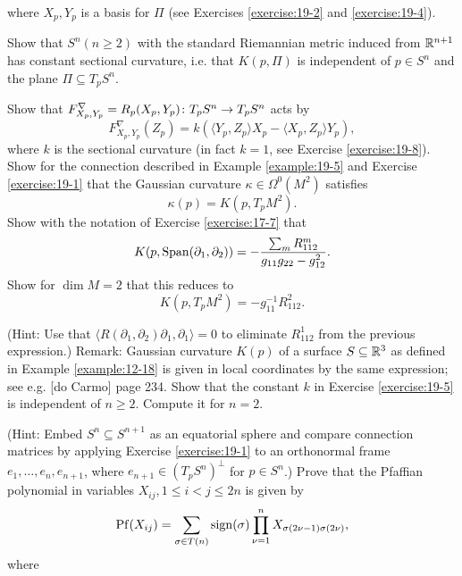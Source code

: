 \begin{enumerate}[label=\theexercise.\arabic*.,ref=\theexercise.\arabic*,leftmargin=2.7em]
\[    \]
    where ${X}_{p},{Y}_{p}$ is a basis for $\Pi$ (see Exercises \ref{exercise:19-2} and \ref{exercise:19-4}).\par
    Show that ${S}^{n}( {n \geq  2})$ with the standard Riemannian metric induced from ${\mathbb{R}}^{n + 1}$ has constant sectional curvature, i.e. that $K( {p,\Pi })$ is independent of $p \in  {S}^{n}$ and the plane $\Pi  \subseteq  {T}_{p}{S}^{n}$.\par
    Show that ${F}_{{X}_{p},{Y}_{p}}^{\nabla } = {R}_{p}( {{X}_{p},{Y}_{p}})\colon {T}_{p}{S}^{n} \rightarrow  {T}_{p}{S}^{n}$ acts by
    \[
      {F}_{{X}_{p},{Y}_{p}}^{\nabla }( {Z}_{p})  = k( {\langle  {{Y}_{p},{Z}_{p}}\rangle  {X}_{p}- \langle  {{X}_{p},{Z}_{p}}\rangle  {Y}_{p}}),
    \]
    where $k$ is the sectional curvature (in fact $k = 1$, see Exercise \ref{exercise:19-8}).
  \NewItem Show for the connection described in Example \ref{example:19-5} and Exercise \ref{exercise:19-1} that the Gaussian curvature $\kappa  \in  {\Omega }^{0}( {M}^{2})$ satisfies
    \[
      \kappa ( p)  = K( {p,{T}_{p}{M}^{2}}).
    \]
  \NewItem Show with the notation of Exercise \ref{exercise:17-7} that
    \[
      K( {p,\mathrm{Span}( {{\partial }_{1},{\partial }_{2}}) })  = - \frac{\sum_{m}{R}_{112}^{m}}{{g}_{11}{g}_{22}- {g}_{12}^{2}}.
    \]
    Show for $\dim M = 2$ that this reduces to
    \[
      K( {p,{T}_{p}{M}^{2}})  = - {g}_{11}^{-1}{R}_{112}^{2}.
    \]
    \par(Hint: Use that $\langle  {R( {{\partial }_{1},{\partial }_{2}}) {\partial }_{1},{\partial }_{1}}\rangle   = 0$ to eliminate ${R}_{112}^{1}$ from the previous expression.)
    Remark: Gaussian curvature $K( p)$ of a surface $S \subseteq  {\ensuremath{\mathbb{R}}}^{3}$ as defined in Example \ref{example:12-18} is given in local coordinates by the same expression; see e.g. [do Carmo]\supercite{do-Carmo} page 234.
  \NewItem Show that the constant $k$ in Exercise \ref{exercise:19-5} is independent of $n \geq  2$. Compute it for $n = 2$.
    \par(Hint: Embed ${S}^{n} \subseteq  {S}^{n + 1}$ as an equatorial sphere and compare connection matrices by applying Exercise \ref{exercise:19-1} to an orthonormal frame ${e}_{1},\ldots,{e}_{n},{e}_{n + 1}$, where ${e}_{n + 1} \in  {( {T}_{p}{S}^{n}) }^{ \bot  }$ for $p \in  {S}^{n}$.)
  \NewItem Prove that the Pfaffian polynomial in variables ${X}_{ij},1 \leq  i < j \leq  {2n}$ is given by
    \[
      \mathrm{Pf}( {X}_{ij})  = \sum_{{\sigma  \in  T( n) }}\mathrm{sign}( \sigma ) \mathop{\prod }\limits_{{\nu  = 1}}^{n}{X}_{\sigma ( {{2\nu }- 1}) \sigma ( {2\nu }) },
    \]
    where

\end{enumerate}
